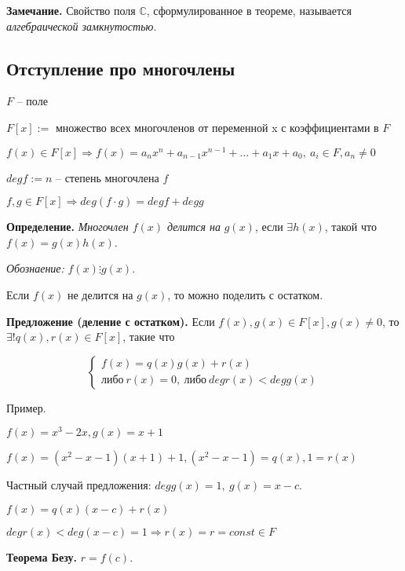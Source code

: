 \vspace{\baselineskip}
\textbf{Замечание.} Свойство поля $\mathbb{C}$, сформулированное в теореме, называется \textit{алгебраической замкнутостью}.

\subsection{Отступление про многочлены}

$F$ -- поле

$F[x] :=$ множество всех многочленов от переменной x с коэффициентами в $F$

$f(x) \in F[x] \Rightarrow f(x) = a_n x^n + a_{n-1} x^{n-1}+ \dots + a_1 x + a_0, \ a_i \in F, a_n \neq 0$

$deg f := n$ -- степень многочлена $f$

$f, g \in F[x] \Rightarrow deg(f \cdot g) = degf + deg g$

\vspace{\baselineskip}
\textbf{Определение.} \textit{Многочлен $f(x)$ делится на} $g(x)$, если $\exists h(x)$, такой что $f(x) = g(x) h(x)$.

\textit{Обознаение:} $f(x) \vdots g(x)$.

Если $f(x)$ не делится на $g(x)$, то можно поделить с остатком.

\vspace{\baselineskip}
\textbf{Предложение (деление с остатком).} Если $f(x), g(x) \in F[x], g(x) \neq 0$, то $\exists ! q(x), r(x) \in F[x]$, такие что

\[
	\left\{
		\begin{aligned}
			f(x) = q(x) g(x) + r(x)  \\
			либо \ r(x) = 0, \ либо \ degr(x) < degg(x) 
		\end{aligned}
	\right.
\]

\vspace{\baselineskip}
Пример.

$f(x) = x^3 - 2x, g(x) = x + 1$

$f(x) = (x^2 - x - 1)(x + 1) + 1, (x^2 - x - 1) = q(x), 1 = r(x)$

\vspace{\baselineskip}
Частный случай предложения: $deg g(x) = 1, \ g(x) = x - c$.

$f(x) = q(x) (x - c) + r(x)$

$deg r(x) < deg (x - c) = 1 \Rightarrow r(x) = r = const \in F$

\vspace{\baselineskip}
\textbf{Теорема Безу.} $r = f(c)$.


